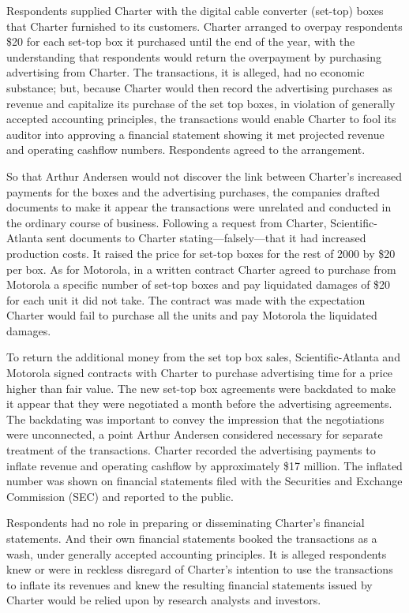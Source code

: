   Respondents supplied Charter with the digital cable converter (set-top) boxes that Charter furnished to its customers. Charter arranged to overpay respondents \$20 for each set-top box it purchased until the end of the year, with the understanding that respondents would return the overpayment by purchasing advertising from Charter. The transactions, it is alleged, had no economic substance; but, because Charter would then record the advertising purchases as revenue and capitalize its purchase of the set top boxes, in violation of generally accepted accounting principles, the transactions would enable Charter to fool its auditor into approving a financial statement showing it met projected revenue and operating cashflow numbers. Respondents agreed to the arrangement.

  So that Arthur Andersen would not discover the link between Charter's increased payments for the boxes and the advertising purchases, the companies drafted documents to make it appear the transactions were unrelated and conducted in the ordinary course of business. Following a request from Charter, Scientific-Atlanta sent documents to Charter stating---falsely---that it had increased production costs. It raised the price for set-top boxes for the rest of 2000 by \$20 per box. As for Motorola, in a written contract Charter agreed to purchase from Motorola a specific number of set-top boxes and pay liquidated damages of \$20 for each unit it did not take. The contract was made with the expectation Charter would fail to purchase all the units and pay Motorola the liquidated damages.

  To return the additional money from the set top box sales, Scientific-Atlanta and Motorola signed contracts with Char\newpage ter to purchase advertising time for a price higher than fair value. The new set-top box agreements were backdated to make it appear that they were negotiated a month before the advertising agreements. The backdating was important to convey the impression that the negotiations were unconnected, a point Arthur Andersen considered necessary for separate treatment of the transactions. Charter recorded the advertising payments to inflate revenue and operating cashflow by approximately \$17 million. The inflated number was shown on financial statements filed with the Securities and Exchange Commission (SEC) and reported to the public.

  Respondents had no role in preparing or disseminating Charter's financial statements. And their own financial statements booked the transactions as a wash, under generally accepted accounting principles. It is alleged respondents knew or were in reckless disregard of Charter's intention to use the transactions to inflate its revenues and knew the resulting financial statements issued by Charter would be relied upon by research analysts and investors.

